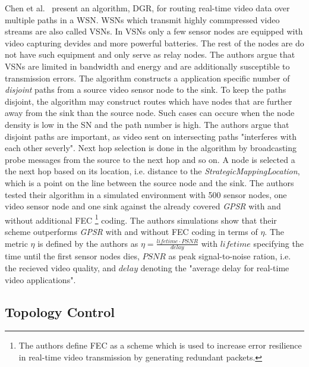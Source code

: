 Chen et al.~\cite{chen2011itinerary} present an algorithm, \ac{DGR}, for
routing real-time video data over multiple paths in a \ac{WSN}. \acp{WSN} which
transmit highly commpressed video streams are also called \acp{VSN}. In
\acp{VSN} only a few sensor nodes are equipped with video capturing devides and
more powerful batteries. The rest of the nodes are do not have such equipment
and only serve as relay nodes. The authors argue that \acp{VSN} are limited in
bandwidth and energy and are additionally susceptible to transmission errors.
The algorithm constructs a application specific number of \textit{disjoint}
paths from a source video sensor node to the sink. To keep the paths
disjoint, the algorithm may construct routes which have nodes that are further
away from the sink than the source node. Such cases can occure when the node
density is low in the \ac{SN} and the path number is high. The authors argue
that disjoint paths are important, as video sent on intersecting paths
"interferes with each other severly". Next hop selection is done in the
algorithm by broadcasting probe messages from the source to the next hop and so
on. A node is selected a the next hop based on its location, i.e. distance to
the \textit{StrategicMappingLocation}, which is a point on the line between the
source node and the sink. The authors tested their algorithm in a simulated
environment with 500 sensor nodes, one video sensor node and one sink against
the already covered \textit{GPSR} with and without additional \ac{FEC}
\footnote{The authors define \ac{FEC} as a scheme which is used to increase
error resilience in real-time video transmission by generating redundant
packets.} coding. The authors simulations show that their scheme outperforms
\textit{GPSR} with and without \ac{FEC} coding in terms of $ \eta $. The metric
$ \eta $ is defined by the authors as $ \eta = \frac{lifetime \cdot
PSNR}{delay}$ with $ lifetime $ specifying the time until the first sensor
nodes dies, $ PSNR $ as peak signal-to-noise ration, i.e. the recieved video
quality, and $ delay $ denoting the "average delay for real-time video
applications".

\subsection{Topology Control}
\label{sec:Topology Control}

